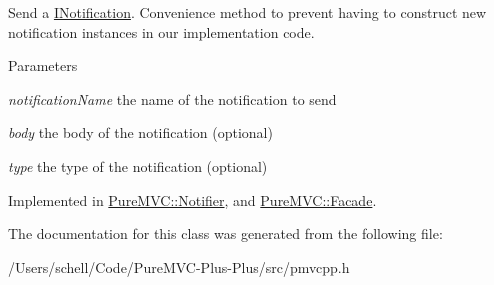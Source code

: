 Send a {\ttfamily \hyperlink{class_pure_m_v_c_1_1_i_notification}{INotification}}. Convenience method to prevent having to construct new notification instances in our implementation code.


\begin{DoxyParams}{Parameters}
\item[{\em notificationName}]the name of the notification to send \item[{\em body}]the body of the notification (optional) \item[{\em type}]the type of the notification (optional) \end{DoxyParams}


Implemented in \hyperlink{class_pure_m_v_c_1_1_notifier_a55a358ee2661ecc08400653016fdb497}{PureMVC::Notifier}, and \hyperlink{class_pure_m_v_c_1_1_facade_a39a61e0a65d0f979848d36fe99cfd5f5}{PureMVC::Facade}.

The documentation for this class was generated from the following file:\begin{DoxyCompactItemize}
\item 
/Users/schell/Code/PureMVC-\/Plus-\/Plus/src/pmvcpp.h\end{DoxyCompactItemize}
